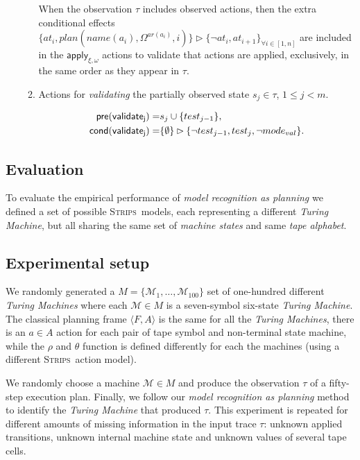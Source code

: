 \documentclass[letterpaper]{article} %
\newcommand{\tup}[1]{{\langle #1 \rangle}}
\newcommand{\pre}{\mathsf{pre}}     %
\newcommand{\cond}{\mathsf{cond}}   %
\newcommand{\strips}{\textsc{Strips}}     %
\begin{document}
\begin{itemize}
\begin{enumerate}
When the observation $\tau$ includes observed actions, then the extra conditional effects $\{at_{i},plan(name(a_i),\Omega^{ar(a_i)},i)\}\rhd\{\neg at_{i},at_{i+1}\}_{\forall i\in [1,n]}$ are included in the $\mathsf{apply_{\xi,\omega}}$ actions to validate that actions are applied, exclusively, in the same order as they appear in $\tau$.\\

\item Actions for {\em validating} the partially observed state $s_j\in\tau$, {\tt\small $1\leq j< m$}.
\begin{small}
\begin{align*}
\hspace*{7pt}\pre(\mathsf{validate_{j}})=&s_j\cup\{test_{j-1}\},\\
\cond(\mathsf{validate_{j}})=&\{\emptyset\}\rhd\{\neg test_{j-1}, test_j,\neg mode_{val}\}.
\end{align*}
\end{small}
\end{enumerate}
\end{itemize}


\subsection{Evaluation}
\label{sec:evaluation}
To evaluate the empirical performance of {\em model recognition as planning} we defined a set of possible \strips\ models, each representing a different {\em Turing Machine}, but all sharing the same set of {\em machine states} and same {\em tape alphabet}.

\subsection{Experimental setup}
We randomly generated a $M=\{\mathcal{M}_1,\ldots,\mathcal{M}_{100}\}$ set of one-hundred different {\em Turing Machines} where each $\mathcal{M}\in M$ is a seven-symbol six-state {\em Turing Machine}. The classical planning frame $\tup{F,A}$ is the same for all the {\em Turing Machines}, there is an $a\in A$ action for each pair of tape symbol and non-terminal state machine, while the $\rho$ and $\theta$ function is defined differently for each the machines (using a different \strips\ action model).

We randomly choose a machine $\mathcal{M}\in M$ and produce the observation $\tau$ of a fifty-step execution plan. Finally, we follow our {\em model recognition as planning} method to identify the {\em Turing Machine} that produced $\tau$. This experiment is repeated for different amounts of missing information in the input trace $\tau$: unknown applied transitions, unknown internal machine state and unknown values of several tape cells.
\end{document}
